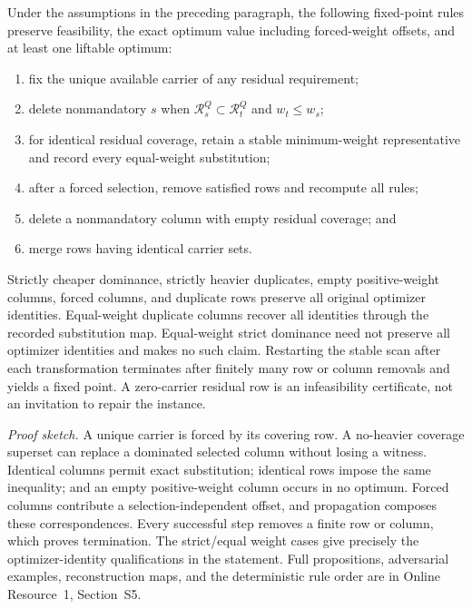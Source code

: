 \begin{proposition}
\label{prop:aor-preprocessing-feasibility-core}
Under the assumptions in the preceding paragraph, the following fixed-point
rules preserve feasibility, the exact optimum value including forced-weight
offsets, and at least one liftable optimum:
\begin{enumerate}
 \item fix the unique available carrier of any residual requirement;
 \item delete nonmandatory \(s\) when
       \(\mathcal R_s^Q\subset\mathcal R_t^Q\) and \(w_t\leq w_s\);
 \item for identical residual coverage, retain a stable minimum-weight
       representative and record every equal-weight substitution;
 \item after a forced selection, remove satisfied rows and recompute all
       rules;
 \item delete a nonmandatory column with empty residual coverage; and
 \item merge rows having identical carrier sets.
\end{enumerate}
Strictly cheaper dominance, strictly heavier duplicates, empty positive-weight
columns, forced columns, and duplicate rows preserve all original optimizer
identities.  Equal-weight duplicate columns recover all identities through the
recorded substitution map.  Equal-weight strict dominance need not preserve
all optimizer identities and makes no such claim.  Restarting the stable scan
after each transformation terminates after finitely many row or column
removals and yields a fixed point.  A zero-carrier residual row is an
infeasibility certificate, not an invitation to repair the instance.
\end{proposition}

\noindent\emph{Proof sketch.}
A unique carrier is forced by its covering row.  A no-heavier coverage
superset can replace a dominated selected column without losing a witness.
Identical columns permit exact substitution; identical rows impose the same
inequality; and an empty positive-weight column occurs in no optimum.  Forced
columns contribute a selection-independent offset, and propagation composes
these correspondences.  Every successful step removes a finite row or column,
which proves termination.  The strict/equal weight cases give precisely the
optimizer-identity qualifications in the statement.  Full propositions,
adversarial examples, reconstruction maps, and the deterministic rule order
are in Online Resource~1, Section~S5.

